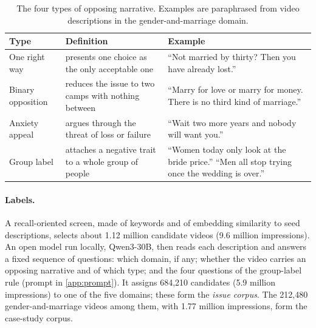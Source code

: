 \begin{table}[t]
\caption{The four types of opposing narrative. Examples are paraphrased from video descriptions in the gender-and-marriage domain.}
\label{tab:taxonomy}
\centering\small
\begin{tabularx}{\textwidth}{@{}L{2.5cm} L{5.4cm} Y@{}}
\toprule
Type & Definition & Example\\
\midrule
One right way & presents one choice as the only acceptable one & ``Not married by thirty? Then you have already lost.''\\
Binary opposition & reduces the issue to two camps with nothing between & ``Marry for love or marry for money. There is no third kind of marriage.''\\
Anxiety appeal & argues through the threat of loss or failure & ``Wait two more years and nobody will want you.''\\
Group label & attaches a negative trait to a whole group of people & ``Women today only look at the bride price.'' ``Men all stop trying once the wedding is over.''\\
\bottomrule
\end{tabularx}
\end{table}

\paragraph{Labels.} A recall-oriented screen, made of keywords and of embedding similarity to seed descriptions, selects about 1.12 million candidate videos (9.6 million impressions). An open model run locally, Qwen3-30B, then reads each description and answers a fixed sequence of questions: which domain, if any; whether the video carries an opposing narrative and of which type; and the four questions of the group-label rule (prompt in \cref{app:prompt}). It assigns 684{,}210 candidates (5.9 million impressions) to one of the five domains; these form the \emph{issue corpus}. The 212{,}480 gender-and-marriage videos among them, with 1.77 million impressions, form the case-study corpus.

